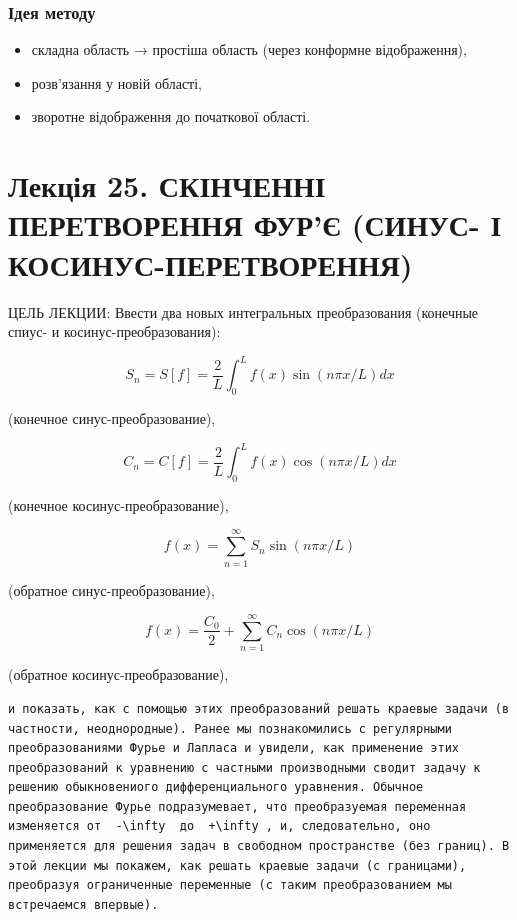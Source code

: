 \documentclass[
  ukrainian,
]{article}
\begin{document}
\subsubsection{Ідея
методу}\label{ux456ux434ux435ux44f-ux43cux435ux442ux43eux434ux443}

\begin{itemize}
\item
  складна область → простіша область (через конформне відображення),
\item
  розв'язання у новій області,
\item
  зворотне відображення до початкової області.
\end{itemize}

\section{Лекція 25. СКІНЧЕННІ ПЕРЕТВОРЕННЯ ФУР'Є (СИНУС- І
КОСИНУС-ПЕРЕТВОРЕННЯ)}\label{ux43bux435ux43aux446ux456ux44f-25.-ux441ux43aux456ux43dux447ux435ux43dux43dux456-ux43fux435ux440ux435ux442ux432ux43eux440ux435ux43dux43dux44f-ux444ux443ux440ux454-ux441ux438ux43dux443ux441--ux456-ux43aux43eux441ux438ux43dux443ux441-ux43fux435ux440ux435ux442ux432ux43eux440ux435ux43dux43dux44f}

ЦЕЛЬ ЛЕКЦИИ: Ввести два новых интегральных преобразования (конечные
спиус- и косинус-преобразования):

\[
S_n = S[f] = \frac{2}{L} \int_0^L f(x) \sin(n\pi x/L) dx
\]

(конечное синус-преобразование),

\[
C_n = C[f] = \frac{2}{L} \int_0^L f(x) \cos(n\pi x/L) dx
\]

(конечное косинус-преобразование),

\[
f(x) = \sum_{n=1}^{\infty} S_n \sin(n\pi x/L)
\]

(обратное синус-преобразование),

\[
f(x) = \frac{C_0}{2} + \sum_{n=1}^{\infty} C_n \cos(n\pi x/L)
\]

(обратное косинус-преобразование),

\begin{verbatim}
и показать, как с помощью этих преобразований решать краевые задачи (в частности, неоднородные). Ранее мы познакомились с регулярными преобразованиями Фурье и Лапласа и увидели, как применение этих преобразований к уравнению с частными производными сводит задачу к решению обыкновениого дифференциального уравнения. Обычное преобразование Фурье подразумевает, что преобразуемая переменная изменяется от  -\infty  до  +\infty , и, следовательно, оно применяется для решения задач в свободном пространстве (без границ). В этой лекции мы покажем, как решать краевые задачи (с границами), преобразуя ограниченные переменные (с таким преобразованием мы встречаемся впервые).
\end{verbatim}
\end{document}
